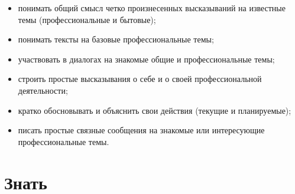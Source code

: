 \begin{itemize}
    \item понимать общий смысл четко произнесенных высказываний на известные темы (профессиональные и бытовые);
    \item понимать тексты на базовые профессиональные темы;
    \item участвовать в диалогах на знакомые общие и профессиональные темы;
    \item строить простые высказывания о себе и о своей профессиональной деятельности;
    \item кратко обосновывать и объяснить свои действия (текущие и планируемые);
    \item писать простые связные сообщения на знакомые или интересующие профессиональные темы.
\end{itemize}

\section*{Знать}
